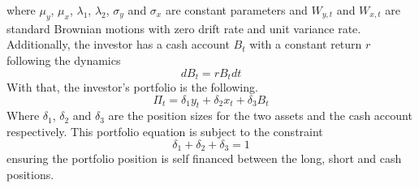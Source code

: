 where $\mu_y$, $\mu_x$, $\lambda_1$, $\lambda_2$, $\sigma_y$ and $\sigma_x$ are constant parameters and $W_{y,t}$ and $W_{x,t}$ are standard Brownian motions with zero drift rate and unit variance rate. Additionally, the investor has a cash account $B_t$
with a constant return $r$ following the dynamics
\begin{equation}
    dB_t=rB_tdt
\end{equation}
With that, the investor's portfolio is the following.
\begin{equation}
    \label{e:portfolio-equation}
    \Pi_t=\delta_1 y_t + \delta_2 x_t + \delta_3 B_t
\end{equation}
Where $\delta_1$, $\delta_2$ and $\delta_3$ are the position sizes for the two assets and the cash account respectively. This portfolio equation is subject to the constraint 
\begin{equation}
    \delta_1 + \delta_2 + \delta_3 = 1
\end{equation}
ensuring the portfolio position is self financed between the long, short and cash positions. 


